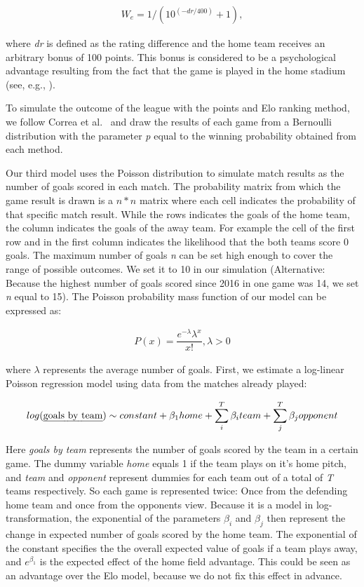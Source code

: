 \documentclass[12pt,a4paper]{article}
\begin{document}
\begin{align}
W_e = 1/(10^{(-dr/400)}+1),
\end{align}

where \emph{dr} is defined as the rating difference and the home team
receives an arbitrary bonus of 100 points. This bonus is considered to
be a psychological advantage resulting from the fact that the game is
played in the home stadium (see, e.g., \textcite{Pollard2008}).

To simulate the outcome of the league with the points and Elo ranking
method, we follow Correa et al.~\autocite*{correa} and draw the results
of each game from a Bernoulli distribution with the parameter \emph{p}
equal to the winning probability obtained from each method.

Our third model uses the Poisson distribution to simulate match results
as the number of goals scored in each match. The probability matrix from
which the game result is drawn is a \(n * n\) matrix where each cell
indicates the probability of that specific match result. While the rows
indicates the goals of the home team, the column indicates the goals of
the away team. For example the cell of the first row and in the first
column indicates the likelihood that the both teams score \(0\) goals.
The maximum number of goals \emph{n} can be set high enough to cover the
range of possible outcomes. We set it to 10 in our simulation
(Alternative: Because the highest number of goals scored since 2016 in
one game was 14, we set \emph{n} equal to 15). The Poisson probability
mass function of our model can be expressed as:

\begin{align}
P(x) = \dfrac{e^{-\lambda}\lambda^x}{x!}, \lambda > 0
\end{align}

where \(\lambda\) represents the average number of goals. First, we
estimate a log-linear Poisson regression model using data from the
matches already played:

\begin{align}
log(\text{\emph{goals by team}}) \sim constant + \beta_1 home + \sum_{i}^{T} \beta_i team + \sum_{j}^{T} \beta_j opponent
\end{align}

Here \emph{goals by team} represents the number of goals scored by the
team in a certain game. The dummy variable \emph{home} equals 1 if the
team plays on it's home pitch, and \emph{team} and \emph{opponent}
represent dummies for each team out of a total of \emph{T} teams
respectively. So each game is represented twice: Once from the defending
home team and once from the opponents view. Because it is a model in
log-transformation, the exponential of the parameters \(\beta_i\) and
\(\beta_j\) then represent the change in expected number of goals scored
by the home team. The exponential of the constant specifies the the
overall expected value of goals if a team plays away, and
\(e^{\beta_1}\) is the expected effect of the home field advantage. This
could be seen as an advantage over the Elo model, because we do not fix
this effect in advance.
\end{document}
